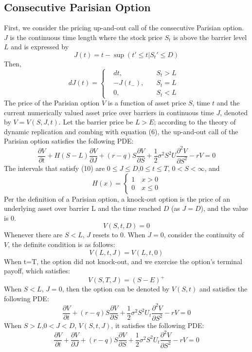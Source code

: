 \documentclass[preprint,12pt]{elsarticle}
\begin{document}
\subsection{Consecutive Parisian Option}
First, we consider the pricing up-and-out call of the consecutive Parisian option. $J$ is the continuous time length where the stock price $S_t$  is above the barrier level $L$ and is expressed by
\begin{equation}
J(t)=t-\sup(t'\leq t|S_t'\leq D)
\end{equation}
Then,	
\begin{equation}
dJ(t)=\left\{
\begin{aligned}
&dt,\quad &S_t>L \\
&-J(t_-),\quad&S_t=L\\
&0,\quad&S_t<L&
\end{aligned}
\right.
\end{equation}
The price of the Parisian option $V$ is a function of asset price $S$, time $t$ and the current numerically valued asset price over barriers in continuous time $J$, denoted by $V=V(S,J,t)$. Let the barrier price be $L>E$; according to the theory of dynamic replication and combing with equation (6), the up-and-out call of the Parisian option satisfies the following PDE:
\begin{equation}
\label{eq}
\frac{\partial V}{\partial t}+H(S-L)\frac{\partial V}{\partial J}+(r-q)S\frac{\partial V}{\partial S}+\frac{1}{2}\sigma^2S^2U\frac{\partial^2 V}{\partial S^2}-rV=0
\end{equation}
The intervals that satisfy (10) are $0≤J≤D$,$0≤t≤T$, $0<S<\infty$, and 
\begin{equation}
H(x)=\left\{
\begin{aligned}
1 \quad x>0 \\
0 \quad x\leq 0
\end{aligned}
\right.
\end{equation}
Per the definition of a Parisian option, a knock-out option is the price of an underlying asset over barrier L and the time reached $D$ (as $J=D$), and the value is 0. 
$$V(S,t,D)=0$$
Whenever there are $S<L$, $J$ resets to 0. When $J=0$, consider the continuity of $V$, the definite condition is as follows:
$$V(L,t,J)=V(L,t,0)$$
When t=T, the option did not knock-out, and we exercise the option’s terminal payoff, which satisfies:
$$V(S,T,J)=(S-E)^+$$
When $S<L$, $J=0$, then the option can be denoted by $V(S,t)$  and satisfies the following PDE:
\begin{equation}
\label{down}
\frac{\partial V}{\partial t}+(r-q)S\frac{\partial V}{\partial S}+\frac{1}{2}\sigma^2S^2U_t\frac{\partial^2 V}{\partial S^2}-rV=0
\end{equation}
When $S>L$,$0<J<D$, $V(S,t,J)$, it satisfies the following PDE:
\begin{equation}
\label{up}
\frac{\partial V}{\partial t}+\frac{\partial V}{\partial J}+(r-q)S\frac{\partial V}{\partial S}+\frac{1}{2}\sigma^2S^2U_t\frac{\partial^2 V}{\partial S^2}-rV=0
\end{equation}
\end{document}
